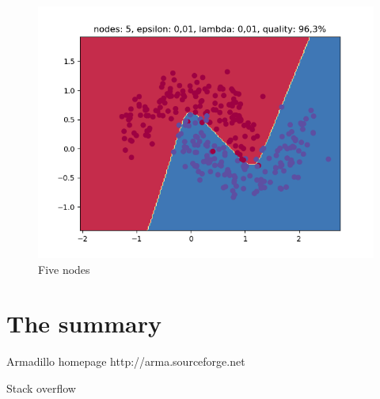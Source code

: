 \documentclass[3p,twocolumn]{elsarticle}
\begin{document}
\begin{figure}[h]
\label{fig:fig5}
  \includegraphics[width=\linewidth]{wykresy/13.png}
	\caption{ Five nodes}
	\label{fig5}
\end{figure}

\section{The summary}


%

 \begin{thebibliography}{00}

%

  Armadillo homepage http://arma.sourceforge.net
 
  Stack overflow

 \end{thebibliography}
\end{document}
